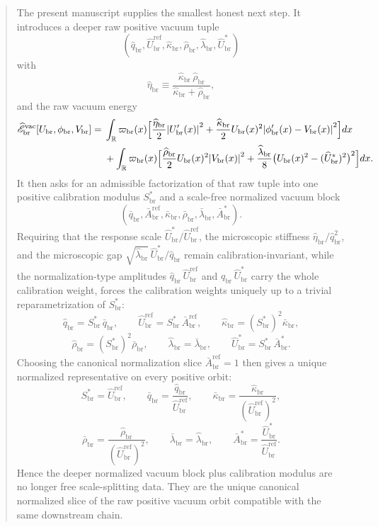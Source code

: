 \documentclass[11pt]{article}
\newcommand{\ProfWeight}{\varpi_{\mathrm{br}}}
\newcommand{\RespVacAmp}{U_{\mathrm{br}}}
\newcommand{\RespVacPhase}{\phi_{\mathrm{br}}}
\newcommand{\RespVacCarrier}{V_{\mathrm{br}}}
\newcommand{\RespScaleEq}{S_{\mathrm{br}}^{\ast}}
\newcommand{\RespScaleReadout}{\bar q_{\mathrm{br}}}
\newcommand{\RespScaleAmpRef}{\bar A_{\mathrm{br}}^{\mathrm{ref}}}
\newcommand{\RespScaleCov}{\bar\kappa_{\mathrm{br}}}
\newcommand{\RespScaleRelax}{\bar\rho_{\mathrm{br}}}
\newcommand{\RespScaleWell}{\bar\lambda_{\mathrm{br}}}
\newcommand{\RespScaleAmpEq}{\bar A_{\mathrm{br}}^{\ast}}
\newcommand{\RespRawReadout}{\widehat q_{\mathrm{br}}}
\newcommand{\RespRawRef}{\widehat U_{\mathrm{br}}^{\mathrm{ref}}}
\newcommand{\RespRawCov}{\widehat\kappa_{\mathrm{br}}}
\newcommand{\RespRawRelax}{\widehat\rho_{\mathrm{br}}}
\newcommand{\RespRawWell}{\widehat\lambda_{\mathrm{br}}}
\newcommand{\RespRawEq}{\widehat U_{\mathrm{br}}^{\ast}}
\newcommand{\RespRawIso}{\widehat\eta_{\mathrm{br}}}
\newcommand{\RespRawEnergy}{\widehat{\mathscr E}_{\mathrm{br}}^{\mathrm{vac}}}
\begin{document}
\begin{abstract}
The present manuscript supplies the smallest honest next step. It introduces a deeper raw positive vacuum tuple
\[
(\RespRawReadout,\RespRawRef,\RespRawCov,\RespRawRelax,\RespRawWell,\RespRawEq)
\]
with
\[
\RespRawIso\equiv\frac{\RespRawCov\,\RespRawRelax}{\RespRawCov+\RespRawRelax},
\]
and the raw vacuum energy
\begin{align*}
\RespRawEnergy[\RespVacAmp,\RespVacPhase,\RespVacCarrier]
=\;&
\int_{\mathbb R}\ProfWeight(x)\Bigl[
\frac{\RespRawIso}{2}\abs{\RespVacAmp'(x)}^2
+
\frac{\RespRawCov}{2}\RespVacAmp(x)^2\abs{\RespVacPhase'(x)-\RespVacCarrier(x)}^2
\Bigr]dx
\nonumber\\
&+
\int_{\mathbb R}\ProfWeight(x)\Bigl[
\frac{\RespRawRelax}{2}\RespVacAmp(x)^2\abs{\RespVacCarrier(x)}^2
+
\frac{\RespRawWell}{8}\bigl(\RespVacAmp(x)^2-(\RespRawEq)^2\bigr)^2
\Bigr]dx.
\end{align*}
It then asks for an admissible factorization of that raw tuple into one positive calibration modulus \(\RespScaleEq\) and a scale-free normalized vacuum block
\[
(\RespScaleReadout,\RespScaleAmpRef,\RespScaleCov,\RespScaleRelax,\RespScaleWell,\RespScaleAmpEq).
\]
Requiring that the response scale \(\RespRawEq/\RespRawRef\), the microscopic stiffness \(\RespRawIso/\RespRawReadout^2\), and the microscopic gap \(\sqrt{\RespRawWell}\,\RespRawEq/\RespRawReadout\) remain calibration-invariant, while the normalization-type amplitudes \(\RespRawReadout\,\RespRawRef\) and \(\RespRawReadout\,\RespRawEq\) carry the whole calibration weight, forces the calibration weights uniquely up to a trivial reparametrization of \(\RespScaleEq\):
\[
\RespRawReadout=\RespScaleEq\,\RespScaleReadout,\qquad
\RespRawRef=\RespScaleEq\,\RespScaleAmpRef,\qquad
\RespRawCov=(\RespScaleEq)^2\RespScaleCov,
\]
\[
\RespRawRelax=(\RespScaleEq)^2\RespScaleRelax,\qquad
\RespRawWell=\RespScaleWell,\qquad
\RespRawEq=\RespScaleEq\,\RespScaleAmpEq.
\]
Choosing the canonical normalization slice \(\RespScaleAmpRef=1\) then gives a unique normalized representative on every positive orbit:
\[
\RespScaleEq=\RespRawRef,\qquad
\RespScaleReadout=\frac{\RespRawReadout}{\RespRawRef},\qquad
\RespScaleCov=\frac{\RespRawCov}{(\RespRawRef)^2},
\]
\[
\RespScaleRelax=\frac{\RespRawRelax}{(\RespRawRef)^2},\qquad
\RespScaleWell=\RespRawWell,\qquad
\RespScaleAmpEq=\frac{\RespRawEq}{\RespRawRef}.
\]
Hence the deeper normalized vacuum block plus calibration modulus are no longer free scale-splitting data. They are the unique canonical normalized slice of the raw positive vacuum orbit compatible with the same downstream chain.


\end{abstract}
\end{document}
